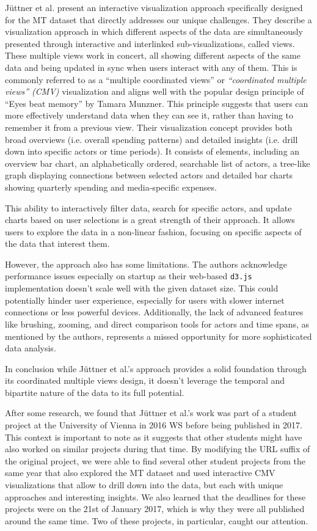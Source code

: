 \documentclass{vgtc}                          %
\begin{document}
Jüttner et al. \cite{Jttner2017MediaTI} present an interactive visualization approach specifically designed for the MT dataset that directly addresses our unique challenges.
They describe a visualization approach in which different aspects of the data are simultaneously presented through interactive and interlinked sub-visualizations, called views. These multiple views work in concert, all showing different aspects of the same data and being updated in sync when users interact with any of them. This is commonly referred to as a ``multiple coordinated views'' or \textit{``coordinated multiple views'' (CMV)} \cite{roberts2007state} visualization and aligns well with the popular design principle of ``Eyes beat memory'' by Tamara Munzner. This principle suggests that users can more effectively understand data when they can see it, rather than having to remember it from a previous view. Their visualization concept provides both broad overviews (i.e. overall spending patterns) and detailed insights (i.e. drill down into specific actors or time periods). It consists of elements, including an overview bar chart, an alphabetically ordered, searchable list of actors, a tree-like graph displaying connections between selected actors and detailed bar charts showing quarterly spending and media-specific expenses.

This ability to interactively filter data, search for specific actors, and update charts based on user selections is a great strength of their approach. It allows users to explore the data in a non-linear fashion, focusing on specific aspects of the data that interest them.

However, the approach also has some limitations. The authors acknowledge performance issues especially on startup as their web-based \texttt{d3.js} implementation doesn't scale well with the given dataset size. This could potentially hinder user experience, especially for users with slower internet connections or less powerful devices. Additionally, the lack of advanced features like brushing, zooming, and direct comparison tools for actors and time spans, as mentioned by the authors, represents a missed opportunity for more sophisticated data analysis.

In conclusion while Jüttner et al.'s approach provides a solid foundation through its coordinated multiple views design, it doesn't leverage the temporal and bipartite nature of the data to its full potential.

After some research, we found that Jüttner et al.'s work was part of a student project at the University of Vienna in 2016 WS \cite{univie10} before being published in 2017. This context is important to note as it suggests that other students might have also worked on similar projects during that time. By modifying the URL suffix of the original project, we were able to find several other student projects from the same year that also explored the MT dataset and used interactive CMV visualizations that allow to drill down into the data, but each with unique approaches and interesting insights. We also learned that the deadlines for these projects were on the 21st of January 2017, which is why they were all published around the same time. Two of these projects, in particular, caught our attention.
\end{document}
